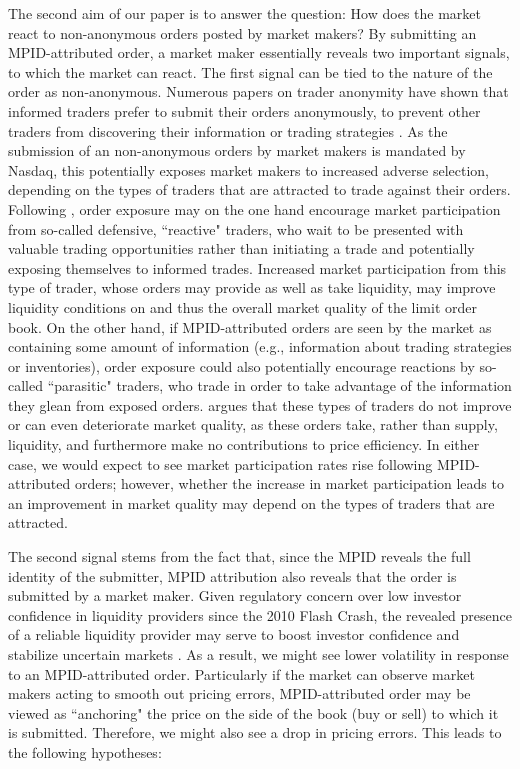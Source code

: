 \documentclass{article}
\begin{document}
The second aim of our paper is to answer the question: How does the market react to non-anonymous orders posted by market makers? By submitting an MPID-attributed order, a market maker essentially reveals two important signals, to which the market can react. The first signal can be tied to the nature of the order as non-anonymous. Numerous papers on trader anonymity have shown that informed traders prefer to submit their orders anonymously, to prevent other traders from discovering their information or trading strategies \citep[see, e.g.,][]{grammig2001knowing,barclay2003competition,comerton2011traders}. As the submission of an non-anonymous orders by market makers is mandated by Nasdaq, this potentially exposes market makers to increased adverse selection, depending on the types of traders that are attracted to trade against their orders. Following \citet{harris1997order}, order exposure may on the one hand encourage market participation from so-called defensive, ``reactive" traders,  who wait to be presented with valuable trading opportunities rather than initiating a trade and potentially exposing themselves to informed trades. Increased market participation from this type of trader, whose orders may provide as well as take liquidity, may improve liquidity conditions on and thus the overall market quality of the limit order book. On the other hand, if MPID-attributed orders are seen by the market as containing some amount of information (e.g., information about trading strategies or inventories), order exposure could also potentially encourage reactions by so-called ``parasitic" traders, who trade in order to take advantage of the information they glean from exposed orders. \citet{harris1997order} argues that these types of traders do not improve or can even deteriorate market quality, as these orders take, rather than supply, liquidity, and furthermore make no contributions to price efficiency. In either case, we would expect to see market participation rates rise following MPID-attributed orders; however, whether the increase in market participation leads to an improvement in market quality may depend on the types of traders that are attracted.

The second signal stems from the fact that, since the MPID reveals the full identity of the submitter, MPID attribution also reveals that the order is submitted by a market maker. Given regulatory concern over low investor confidence in liquidity providers since the 2010 Flash Crash, the revealed presence of a reliable liquidity provider may serve to boost investor confidence and stabilize uncertain markets \citep[see, e.g.,][]{watanabe2015,anand2016market}. As a result, we might see lower volatility in response to an MPID-attributed order. Particularly if the market can observe market makers acting to smooth out pricing errors, MPID-attributed order may be viewed as ``anchoring" the price on the side of the book (buy or sell) to which it is submitted. Therefore, we might also see a drop in pricing errors.  This leads to the following hypotheses:
\end{document}
